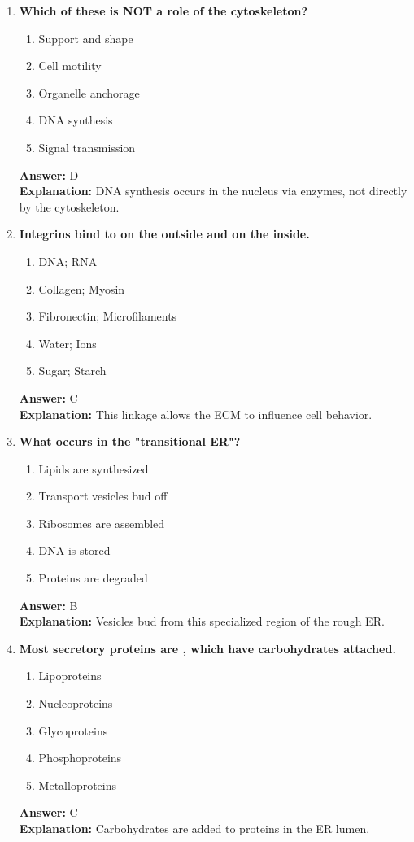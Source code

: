 \documentclass[11pt, a4paper]{article}
\begin{document}
\begin{enumerate}[leftmargin=*, label=\arabic*.]
\item \textbf{Which of these is NOT a role of the cytoskeleton?}
\begin{enumerate}[label=\Alph*.]
\item Support and shape
\item Cell motility
\item Organelle anchorage
\item DNA synthesis
\item Signal transmission
\end{enumerate}
\textbf{Answer:} D \\
\textbf{Explanation:} DNA synthesis occurs in the nucleus via enzymes, not directly by the cytoskeleton.

\item \textbf{Integrins bind to \underline{\hspace{1cm}} on the outside and \underline{\hspace{1cm}} on the inside.}
\begin{enumerate}[label=\Alph*.]
\item DNA; RNA
\item Collagen; Myosin
\item Fibronectin; Microfilaments
\item Water; Ions
\item Sugar; Starch
\end{enumerate}
\textbf{Answer:} C \\
\textbf{Explanation:} This linkage allows the ECM to influence cell behavior.

\item \textbf{What occurs in the "transitional ER"?}
\begin{enumerate}[label=\Alph*.]
\item Lipids are synthesized
\item Transport vesicles bud off
\item Ribosomes are assembled
\item DNA is stored
\item Proteins are degraded
\end{enumerate}
\textbf{Answer:} B \\
\textbf{Explanation:} Vesicles bud from this specialized region of the rough ER.

\item \textbf{Most secretory proteins are \underline{\hspace{1cm}}, which have carbohydrates attached.}
\begin{enumerate}[label=\Alph*.]
\item Lipoproteins
\item Nucleoproteins
\item Glycoproteins
\item Phosphoproteins
\item Metalloproteins
\end{enumerate}
\textbf{Answer:} C \\
\textbf{Explanation:} Carbohydrates are added to proteins in the ER lumen.


\end{enumerate}
\end{document}
